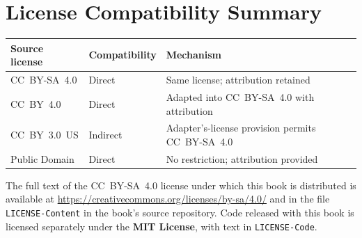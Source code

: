 \section*{License Compatibility Summary}

\begin{center}
\renewcommand{\arraystretch}{1.25}
\begin{tabular}{l l l}
\toprule
\textbf{Source license} & \textbf{Compatibility} & \textbf{Mechanism} \\
\midrule
CC~BY-SA~4.0 & Direct & Same license; attribution retained \\
CC~BY~4.0    & Direct & Adapted into CC~BY-SA~4.0 with attribution \\
CC~BY~3.0~US & Indirect & Adapter's-license provision permits CC~BY-SA~4.0 \\
Public Domain & Direct & No restriction; attribution provided \\
\bottomrule
\end{tabular}
\end{center}

\noindent The full text of the CC~BY-SA~4.0 license under which this
book is distributed is available at \url{https://creativecommons.org/licenses/by-sa/4.0/}
and in the file \texttt{LICENSE-Content} in the book's source repository.
Code released with this book is licensed separately under the
\textbf{MIT License}, with text in \texttt{LICENSE-Code}.

\cleardoublepage
